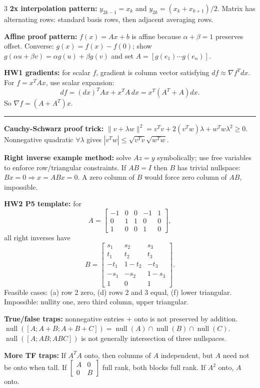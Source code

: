 \documentclass[10pt]{article}
\newcommand{\sect}[1]{\vspace{0.9pt}{\fontsize{7.2}{7.5}\selectfont\textbf{#1}}\vspace{0.25pt}\hrule\vspace{0.8pt}}
\newcommand{\sub}[1]{\textbf{#1}}
\newcommand{\nullsp}{\operatorname{null}}
\begin{document}
\begin{multicols*}{3}
\sub{2x interpolation pattern:} $y_{2k-1}=x_k$ and $y_{2k}=(x_k+x_{k+1})/2$. Matrix has alternating rows: standard basis rows, then adjacent averaging rows.

\sub{Affine proof pattern:} $f(x)=Ax+b$ is affine because $\alpha+\beta=1$ preserves offset. Converse: $g(x)=f(x)-f(0)$; show $g(\alpha u+\beta v)=\alpha g(u)+\beta g(v)$ and set $A=[g(e_1)\cdots g(e_n)]$.

\sub{HW1 gradients:} for scalar $f$, gradient is column vector satisfying $df\approx\nabla f^Tdx$. For $f=x^TAx$, use scalar expansion:
\[
d f=(dx)^TAx+x^TA\,dx=x^T(A^T+A)dx.
\]
So $\nabla f=(A+A^T)x$.

\sect{HW2 Patterns}
\sub{Cauchy-Schwarz proof trick:} $\|v+\lambda w\|^2=v^Tv+2(v^Tw)\lambda+w^Tw\lambda^2\ge0$. Nonnegative quadratic $\forall\lambda$ gives $|v^Tw|\le\sqrt{v^Tv}\sqrt{w^Tw}$.

\sub{Right inverse example method:} solve $Az=y$ symbolically; use free variables to enforce row/triangular constraints. If $AB=I$ then $B$ has trivial nullspace: $Bx=0\Rightarrow x=ABx=0$. A zero column of $B$ would force zero column of $AB$, impossible.

\sub{HW2 P5 template:} for
\[
A=\begin{bmatrix}-1&0&0&-1&1\\0&1&1&0&0\\1&0&0&1&0\end{bmatrix},
\]
all right inverses have
\[
B=\begin{bmatrix}
s_1&s_2&s_3\\ t_1&t_2&t_3\\ -t_1&1-t_2&-t_3\\
-s_1&-s_2&1-s_3\\ 1&0&1
\end{bmatrix}.
\]
Feasible cases: (a) row 2 zero, (d) rows 2 and 3 equal, (f) lower triangular. Impossible: nullity one, zero third column, upper triangular.

\sub{True/false traps:} nonnegative entries + onto is not preserved by addition. $\nullsp([A;A+B;A+B+C])=\nullsp(A)\cap\nullsp(B)\cap\nullsp(C)$. $\nullsp([A;AB;ABC])$ is not generally intersection of three nullspaces.

\sub{More TF traps:} If $A^TA$ onto, then columns of $A$ independent, but $A$ need not be onto when tall. If $\begin{bmatrix}A&0\\0&B\end{bmatrix}$ full rank, both blocks full rank. If $A^2$ onto, $A$ onto.


\end{multicols*}
\end{document}
